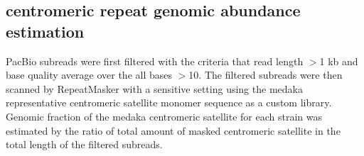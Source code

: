 \subsection*{centromeric repeat genomic abundance estimation}
PacBio subreads were first filtered with the criteria that read length $>$1 kb and base quality average over the all bases $>$10. The filtered subreads were then scanned by RepeatMasker with a sensitive setting using the medaka representative centromeric satellite monomer sequence as a custom library. Genomic fraction of the medaka centromeric satellite for each strain was estimated by the ratio of total amount of masked centromeric satellite in the total length of the filtered subreads.
